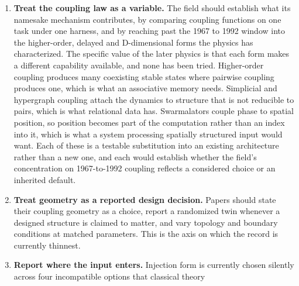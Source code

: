\documentclass[10pt]{article}
\newcounter{none} %
\begin{document}
\begin{enumerate}
  resulting number rather than only the headline result. Where a control
  does not apply it is worth saying so and saying why: a frozen twin
  means nothing for a system whose dynamics is never trained, and a
  coupling ablation means nothing for a model that has no coupling term.
  An unreported control and an inapplicable one look identical to a
  reader, and distinguishing them took us a close reading of every paper
  in Table 1; an earlier draft of this survey still got several of them
  wrong, which is the argument for a standard rather than for close
  reading. Where two papers from one group publish the two sides of an
  ablation, as coRNN and UnICORNN do for damping and coupling and LinOSS
  and D-LinOSS do for damping, the standard would ask for the comparison
  to be run once more, under one protocol, in the later paper.
\item
  \textbf{Treat the coupling law as a variable.} The field should
  establish what its namesake mechanism contributes, by comparing
  coupling functions on one task under one harness, and by reaching past
  the 1967 to 1992 window into the higher-order, delayed and
  D-dimensional forms the physics has characterized. The specific value
  of the later physics is that each form makes a different capability
  available, and none has been tried. Higher-order coupling produces
  many coexisting stable states where pairwise coupling produces one,
  which is what an associative memory needs. Simplicial and hypergraph
  coupling attach the dynamics to structure that is not reducible to
  pairs, which is what relational data has. Swarmalators couple phase to
  spatial position, so position becomes part of the computation rather
  than an index into it, which is what a system processing spatially
  structured input would want. Each of these is a testable substitution
  into an existing architecture rather than a new one, and each would
  establish whether the field's concentration on 1967-to-1992 coupling
  reflects a considered choice or an inherited default.
\item
  \textbf{Treat geometry as a reported design decision.} Papers should
  state their coupling geometry as a choice, report a randomized twin
  whenever a designed structure is claimed to matter, and vary topology
  and boundary conditions at matched parameters. This is the axis on
  which the record is currently thinnest.
\item
  \textbf{Report where the input enters.} Injection form is currently
  chosen silently across four incompatible options that classical theory

\end{enumerate}
\end{document}
